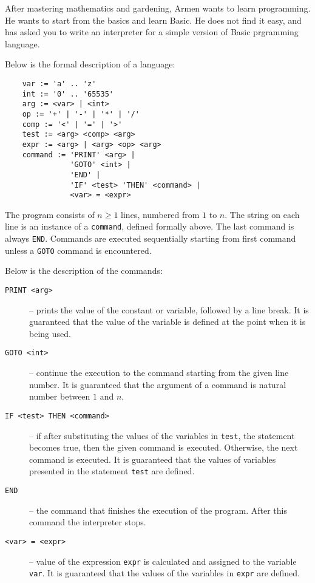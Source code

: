 
After mastering mathematics and gardening, Armen wants to learn programming.
He wants to start from the basics and learn Basic.
He does not find it easy, and has asked you to write an interpreter for a simple version of Basic prgramming language.

Below is the formal description of a language:
\begin{verbatim}
    var := 'a' .. 'z'
    int := '0' .. '65535'
    arg := <var> | <int>
    op := '+' | '-' | '*' | '/'
    comp := '<' | '=' | '>'
    test := <arg> <comp> <arg>
    expr := <arg> | <arg> <op> <arg>
    command := 'PRINT' <arg> |
               'GOTO' <int> |
               'END' |
               'IF' <test> 'THEN' <command> | 
               <var> = <expr>
\end{verbatim}

The program consists of $n \geq 1$ lines, numbered from $1$ to $n$.
The string on each line is an instance of a \texttt{command}, defined formally above.
The last command is always \texttt{END}. 
Commands are executed sequentially starting from first command unless a \texttt{GOTO} command is encountered.

Below is the description of the commands:
\begin{description}
    \item[\texttt{PRINT <arg>}] -- prints the value of the constant or variable, followed by a line break.
    It is guaranteed that the value of the variable is defined at the point when it is being used.
    
    \item[\texttt{GOTO <int>}] -- continue the execution to the command starting from the given line number.
    It is guaranteed that the argument of a command is natural number between $1$ and $n$.
    
    \item[\texttt{IF <test> THEN <command>}] -- if after substituting the values of the variables in \texttt{test}, the statement becomes true, then the given command is executed.
    Otherwise, the next command is executed.
    It is guaranteed that the values of variables presented in the statement \texttt{test} are defined.
    
    \item[\texttt{END}] -- the command that finishes the execution of the program.
    After this command the interpreter stops.
    
    \item[\texttt{<var> = <expr>}] -- value of the expression \texttt{expr} is calculated and assigned to the variable \texttt{var}.
    It is guaranteed that the values of the variables in \texttt{expr} are defined.
\end{description}

